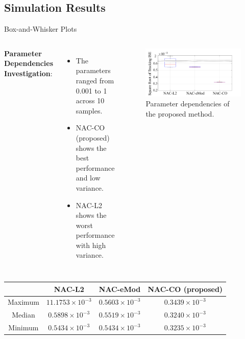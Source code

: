 \documentclass[8pt, aspectratio=169, handout]{beamer}
\begin{document}
\subsection{Simulation Results}

\begin{frame}{\insertsubsectionhead}{Box-and-Whisker Plots}
  
  \begin{columns}
    
      \textbf{Parameter Dependencies Investigation}:

      \begin{itemize}
        \item The parameters ranged from 0.001 to 1 across 10 samples.
        \item NAC-CO (proposed) shows the best performance and low variance.
        \item NAC-L2 shows the worst performance with high variance.
      \end{itemize}


      \begin{figure}
        \includegraphics[width=.99\textwidth]{figures/BoxWhisker.drawio.png}
        \caption{Parameter dependencies of the proposed method.}
      \end{figure}

  \end{columns}

    \begin{table}[!t]
      \renewcommand{\arraystretch}{1.1}
      \centering
      \begin{tabular}{c c c c }
      \hline
      & \textbf{NAC-L2}\!&\!\textbf{NAC-eMod}\!&\!\textbf{NAC-CO} (proposed) 
      \\
      \hline
      \hline 
        Maximum\!&\!$11.1753\!\times\!10^{-3}$\!&\!$0.5603\!\times\!10^{-3}$\!&\!$0.3439\!\times\!10^{-3}$\!\\
      \hline
        Median\!&\!$0.5898\!\times\!10^{-3}$\!&\!$0.5519\!\times\!10^{-3}$\!&\!$0.3240\!\times\!10^{-3}$\!\\
      \hline
        Minimum\!&\!$0.5434\!\times\!10^{-3}$\!&\!$0.5434\!\times\!10^{-3}$\!&\!$0.3235\!\times\!10^{-3}$\!\\
      \hline
      \end{tabular}
      \label{table: error norm}
    \end{table}
    

\end{frame}
\end{document}

